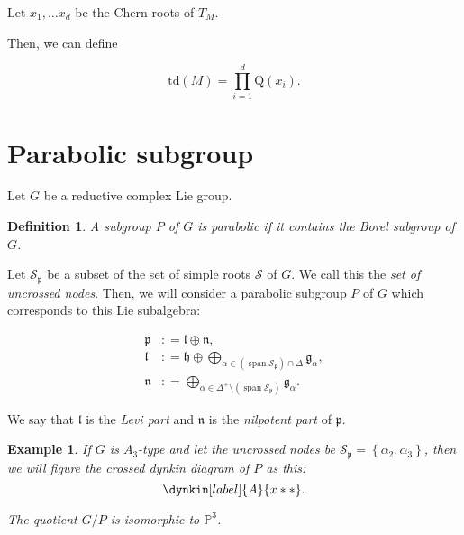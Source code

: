 \documentclass[uplatex,dvipdfmx]{jsarticle}
\newtheorem{definition}{Definition}[section]
\newtheorem{example}{Example}[section]
\newcommand{\defeq}{\mathrel{\mathop:}=}
\newcommand{\td}[1]{\mathrm{td}\left( {#1} \right)}
\begin{document}
Let 
$x_1, \ldots x_d$ 
be the Chern roots of 
$T_M$.

Then, we can define

\begin{equation}
    \td{M}
    =
    \prod_{i=1}^{d}
    \mathrm{Q}(x_i).
\end{equation}


\section{Parabolic subgroup}

Let
$G$
be a reductive complex Lie group.

\begin{definition}
    A subgroup
    $P$
    of
    $G$
    is \textit{parabolic} if it contains the Borel subgroup of
    $G$.
\end{definition}

Let
$\mathcal{S}_{\mathfrak{p}}$
be a subset of the set of simple roots
$\mathcal{S}$
of 
$G$.
We call this the \textit{set of uncrossed nodes}.
Then, we will consider a parabolic subgroup
$P$
of
$G$
which corresponds to this Lie subalgebra:

\begin{align}
    \mathfrak{p} &\defeq 
        \mathfrak{l} 
        \oplus 
        \mathfrak{n}, \\
    \mathfrak{l} &\defeq
        \mathfrak{h}
        \oplus
        \bigoplus_{\alpha \in (\operatorname{span} \mathcal{S}_{\mathfrak{p}}) \cap \Delta}
            \mathfrak{g}_\alpha, \\
    \mathfrak{n} &\defeq
        \bigoplus_{\alpha \in \Delta^+ \setminus (\operatorname{span} \mathcal{S}_{\mathfrak{p}})}
            \mathfrak{g}_\alpha.
\end{align}

We say that
$\mathfrak{l}$
is the \textit{Levi part} and
$\mathfrak{n}$
is the \textit{nilpotent part} of
$\mathfrak{p}$.

\begin{example}
    If
    $G$
    is
    $A_3$-type
    and let the uncrossed nodes be
    $\mathcal{S}_{\mathfrak{p}} = \left\{ \alpha_2, \alpha_3 \right\}$,
    then we will figure the crossed dynkin diagram of
    $P$
    as this:
    \begin{equation}
        \dynkin[label]{A}{x**}.
    \end{equation}

    The quotient
    $G/P$
    is isomorphic to
    $\mathbb{P}^3$.
\end{example}
\end{document}
